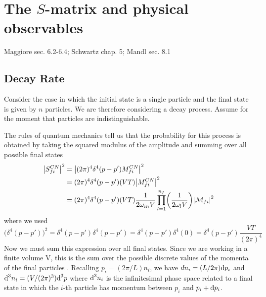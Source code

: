 \documentclass[TheoreticalPhy_ModB.tex]{subfiles}
\begin{document}
\chapter{The $S$-matrix and physical observables}

\textsf{Maggiore sec. 6.2-6.4; Schwartz chap. 5; Mandl sec. 8.1}

\section{Decay Rate}
Consider the case in which the initial state is a single particle and the final state is given by $n$ particles. We are therefore considering a decay process. Assume for the moment that particles are indistinguishable.

\begin{center}

\end{center}
The rules of quantum mechanics tell us that the probability for this process is obtained by taking the squared modulus of the amplitude and summing over all possible final states
\[
\begin{split}
\abs{S_{fi}^{CN}}^2	& = \abs{(2 \pi)^4 \delta^4 (p - p')M_{fi}^{CN}}^2 \\
				& = (2 \pi)^4 \delta^4 (p - p') (VT) \abs{M_{fi}^{CN}}^2 \\
				& = (2 \pi)^4 \delta^4 (p - p')(VT) \frac{1}{2 \omega_{in} V}
					\prod_{l=1}^{n_f} \biggl( \frac{1}{2 \omega_l V} \biggr) \abs{\mathcal{M}_{fi}}^2
\end{split}
\]
where we used
\[\bigl( \delta^4 (p - p') \bigr)^2 = \delta^4 (p - p') \delta^4 (p - p') = \delta^4 (p - p') \delta^4(0) = \delta^4 (p - p') \frac{VT}{(2 \pi)^4}\]
Now we must sum this expression over all final states. Since we are working in a finite volume V, this is the sum over the possible discrete values of the momenta of the final particles .
Recalling $p_i = (2 \pi/L) n_i$, we have $dn_i = (L/2\pi) \textup{d} p_i$ and $\textup{d}^3 n_i = (V/(2 \pi)^3) \textup{d}^3 p$ where $\textup{d}^3 n_i$ is the infinitesimal phase space related to a final state in which the $i$-th particle has momentum between $p_i$ and $p_i + \textup{d} p_i$.
\end{document}
